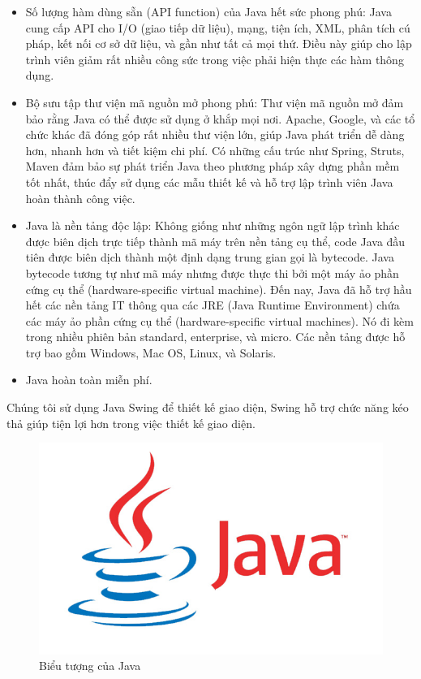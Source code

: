 \documentclass[12pt]{report}
\begin{document}
\begin{itemize}
\begin{itemize}
							\item{Số lượng hàm dùng sẵn (API function) của Java hết sức phong phú: Java cung cấp API cho I/O (giao tiếp dữ liệu), mạng, tiện ích, XML, phân tích cú pháp, kết nối cơ sở dữ liệu, và gần như tất cả mọi thứ. Điều này giúp cho lập trình viên giảm rất nhiều công sức trong việc phải hiện thực các hàm thông dụng.}
							\item{Bộ sưu tập thư viện mã nguồn mở phong phú: Thư viện mã nguồn mở đảm bảo rằng Java có thể được sử dụng ở khắp mọi nơi. Apache, Google, và các tổ chức khác đã đóng góp rất nhiều thư viện lớn, giúp Java phát triển dễ dàng hơn, nhanh hơn và tiết kiệm chi phí. Có những cấu trúc như Spring, Struts, Maven đảm bảo sự phát triển Java theo phương pháp xây dựng phần mềm tốt nhất, thúc đẩy sử dụng các mẫu thiết kế và hỗ trợ lập trình viên Java hoàn thành công việc.}
							\item{Java là nền tảng độc lập: Không giống như những ngôn ngữ lập trình khác được biên dịch trực tiếp thành mã máy trên nền tảng cụ thể, code Java đầu tiên được biên dịch thành một định dạng trung gian gọi là bytecode. Java bytecode tương tự như mã máy nhưng được thực thi bởi một máy ảo phần cứng cụ thể (hardware-specific virtual machine). Đến nay, Java đã hỗ trợ hầu hết các nền tảng IT thông qua các JRE (Java Runtime Environment) chứa các máy ảo phần cứng cụ thể (hardware-specific virtual machines). Nó đi kèm trong nhiều phiên bản standard, enterprise, và micro. Các nền tảng được hỗ trợ bao gồm Windows, Mac OS, Linux, và Solaris. }
							\item{Java hoàn toàn miễn phí.}
						\end{itemize}
						Chúng tôi sử dụng Java Swing để thiết kế giao diện, Swing hỗ trợ chức năng kéo thả giúp tiện lợi hơn trong việc thiết kế giao diện.
						\begin{figure}[H]
					\centering
					\includegraphics[scale=0.5]{images/Java.jpg}
					\caption[Biểu tượng của Java]{Biểu tượng của Java \protect\footnotemark{}}
					\label{fig:Java}
					\end{figure}
					\end{itemize}
\end{document}
